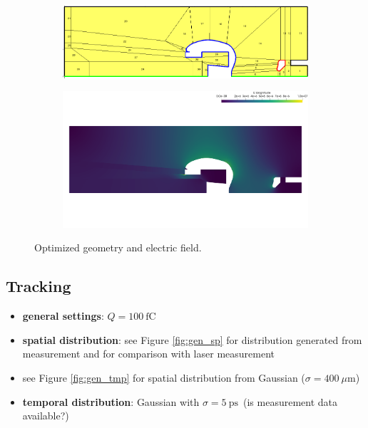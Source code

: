 \begin{center}
\begin{figure}[H]
   \begin{subfigure}{0.45\textwidth}
      \includegraphics[width=\textwidth]{fig/geometry_v6_opt_order=3_run2}
   \end{subfigure}
   \begin{subfigure}{0.45\textwidth}
      \includegraphics[width=\textwidth]{fig/E_v6_opt_order=3_run2}
   \end{subfigure}
   \caption{Optimized geometry and electric field.}
   \label{fig:opt}
\end{figure}
\end{center}

\newpage

\subsection{Tracking}
\begin{itemize}
   \item \textbf{general settings}: $Q=100\ \mathrm{fC}$
   \item \textbf{spatial distribution}: see Figure \ref{fig:gen_sp} for distribution generated from measurement and for comparison with laser measurement
   \item see Figure \ref{fig:gen_tmp} for spatial distribution from Gaussian ($\sigma=400\ \mu \mathrm{m}$)
   \item \textbf{temporal distribution}: Gaussian with $\sigma=5\ \mathrm{ps}$\ (is measurement data available?)
\end{itemize}

